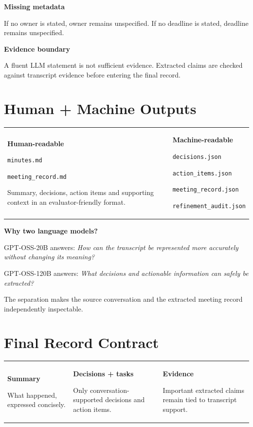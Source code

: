 \documentclass[9pt,a4paper]{extarticle}
\newcommand{\twocard}[4]{%
\begin{minipage}[t]{0.48\textwidth}\begin{card}\textbf{#1}\par #2\end{card}\end{minipage}\hfill%
\begin{minipage}[t]{0.48\textwidth}\begin{card}\textbf{#3}\par #4\end{card}\end{minipage}}
\begin{document}
\vspace{4pt}
\twocard{Missing metadata}{If no owner is stated, owner remains unspecified. If no deadline is stated, deadline remains unspecified.}{Evidence boundary}{A fluent LLM statement is not sufficient evidence. Extracted claims are checked against transcript evidence before entering the final record.}

\vspace{4pt}
\section*{Human + Machine Outputs}
\begin{tabularx}{\textwidth}{@{}XX@{}}
\begin{card}
\textbf{Human-readable}\par
\texttt{minutes.md}\par
\texttt{meeting\_record.md}\par
Summary, decisions, action items and supporting context in an evaluator-friendly format.
\end{card}&
\begin{card}
\textbf{Machine-readable}\par
\texttt{decisions.json}\par
\texttt{action\_items.json}\par
\texttt{meeting\_record.json}\par
\texttt{refinement\_audit.json}
\end{card}
\end{tabularx}

\vspace{4pt}
\begin{card}
\textbf{Why two language models?}\par
GPT-OSS-20B answers: \textit{How can the transcript be represented more accurately without changing its meaning?}\par
GPT-OSS-120B answers: \textit{What decisions and actionable information can safely be extracted?}\par
The separation makes the source conversation and the extracted meeting record independently inspectable.
\end{card}

\section*{Final Record Contract}
\begin{tabularx}{\textwidth}{@{}XXX@{}}
\begin{card}\textbf{Summary}\par What happened, expressed concisely.
\end{card}&
\begin{card}\textbf{Decisions + tasks}\par Only conversation-supported decisions and action items.
\end{card}&
\begin{card}\textbf{Evidence}\par Important extracted claims remain tied to transcript support.
\end{card}
\end{tabularx}
\end{document}
